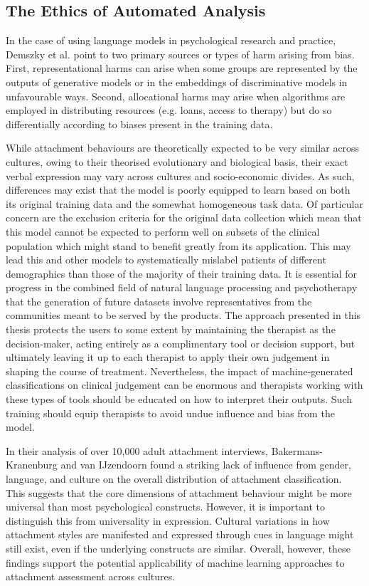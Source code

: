 \documentclass[12pt]{report}
\begin{document}
\subsection{The Ethics of Automated Analysis}
In the case of using language models in psychological research and practice, Demszky et al. \citeyear{Demszky2023} point to two primary sources or types of harm arising from bias.
First, representational harms can arise when some groups are represented by the outputs of generative models or in the embeddings of discriminative models in unfavourable ways.
Second, allocational harms may arise when algorithms are employed in distributing resources (e.g. loans, access to therapy) but do so differentially according to biases present in the training data.

While attachment behaviours are theoretically expected to be very similar across cultures, owing to their theorised evolutionary and biological basis, their exact verbal expression may vary across cultures and socio-economic divides.
As such, differences may exist that the model is poorly equipped to learn based on both its original training data and the somewhat homogeneous task data.
Of particular concern are the exclusion criteria for the original data collection \cite{Talia2017} which mean that this model cannot be expected to perform well on subsets of the clinical population which might stand to benefit greatly from its application.
This may lead this and other models to systematically mislabel patients of different demographics than those of the majority of their training data.
It is essential for progress in the combined field of natural language processing and psychotherapy that the generation of future datasets involve representatives from the communities meant to be served by the products.
The approach presented in this thesis protects the users to some extent by maintaining the therapist as the decision-maker, acting entirely as a complimentary tool or decision support, but ultimately leaving it up to each therapist to apply their own judgement in shaping the course of treatment.
Nevertheless, the impact of machine-generated classifications on clinical judgement can be enormous and therapists working with these types of tools should be educated on how to interpret their outputs.
Such training should equip therapists to avoid undue influence and bias from the model.

In their analysis of over 10,000 adult attachment interviews, Bakermans-Kranenburg and van IJzendoorn \citeyear{Bakermanskranenburg2009} found a striking lack of influence from gender, language, and culture on the overall distribution of attachment classification.
This suggests that the core dimensions of attachment behaviour might be more universal than most psychological constructs.
However, it is important to distinguish this from universality in expression.
Cultural variations in how attachment styles are manifested and expressed through cues in language might still exist, even if the underlying constructs are similar.
Overall, however, these findings support the potential applicability of machine learning approaches to attachment assessment across cultures.
\end{document}
